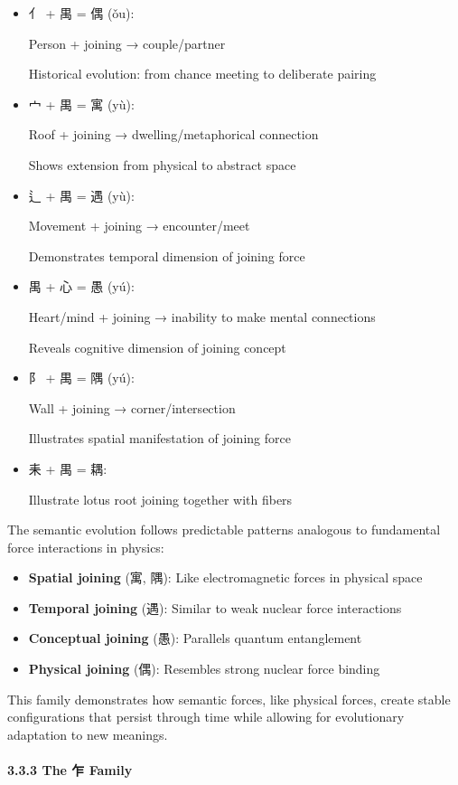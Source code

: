 \documentclass[
  11pt,
  letterpaper,
]{article}
\providecommand{\tightlist}{%
  \setlength{\itemsep}{0pt}\setlength{\parskip}{0pt}}
\begin{document}
\begin{itemize}
\item
  亻 + 禺 = 偶 (ǒu):

  Person + joining → couple/partner

  Historical evolution: from chance meeting to deliberate pairing
\item
  宀 + 禺 = 寓 (yù):

  Roof + joining → dwelling/metaphorical connection

  Shows extension from physical to abstract space
\item
  辶 + 禺 = 遇 (yù):

  Movement + joining → encounter/meet

  Demonstrates temporal dimension of joining force
\item
  禺 + 心 = 愚 (yú):

  Heart/mind + joining → inability to make mental connections

  Reveals cognitive dimension of joining concept
\item
  阝 + 禺 = 隅 (yú):

  Wall + joining → corner/intersection

  Illustrates spatial manifestation of joining force
\item
  耒 + 禺 = 耦:

  Illustrate lotus root joining together with fibers
\end{itemize}

The semantic evolution follows predictable patterns analogous to
fundamental force interactions in physics:

\begin{itemize}
\tightlist
\item
  \textbf{Spatial joining} (寓, 隅): Like electromagnetic forces in
  physical space
\item
  \textbf{Temporal joining} (遇): Similar to weak nuclear force
  interactions
\item
  \textbf{Conceptual joining} (愚): Parallels quantum entanglement
\item
  \textbf{Physical joining} (偶): Resembles strong nuclear force binding
\end{itemize}

This family demonstrates how semantic forces, like physical forces,
create stable configurations that persist through time while allowing
for evolutionary adaptation to new meanings.

\paragraph{3.3.3 The 乍 Family}\label{the-ux4e4d-family}
\end{document}
